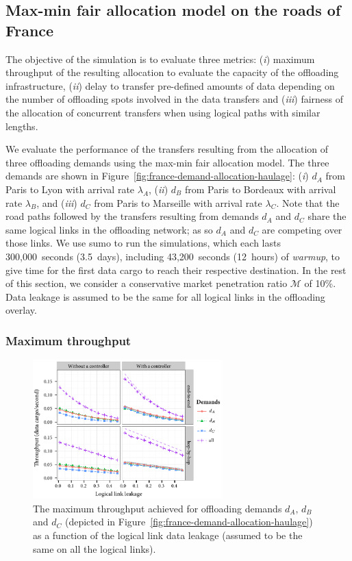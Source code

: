 \subsection{Max-min fair allocation model on the roads of France} 

The objective of the simulation is to evaluate three metrics: (\textit{i}) maximum throughput of the resulting allocation to evaluate the capacity of the offloading infrastructure, (\textit{ii}) delay to transfer pre-defined amounts of data depending on the number of offloading spots involved in the data transfers and (\textit{iii}) fairness of the allocation of concurrent transfers when using logical paths with similar lengths.

We evaluate the performance of the transfers resulting from the allocation of three offloading demands using the max-min fair allocation model. The three demands are shown in Figure~\ref{fig:france-demand-allocation-haulage}: (\textit{i}) $d_A$ from Paris to Lyon with arrival rate $\lambda_A$, (\textit{ii}) $d_B$ from Paris to Bordeaux with arrival rate $\lambda_B$, and (\textit{iii}) $d_C$ from Paris to Marseille with arrival rate $\lambda_C$. Note that the road paths followed by the transfers resulting from demands $d_A$ and $d_C$ share the same logical links in the offloading network; as so $d_A$ and $d_C$ are competing over those links.  We use \acrshort{sumo} to run the simulations, which each lasts 300,000~seconds (3.5~days), including 43,200~seconds (12~hours) of \textit{warmup}, to give time for the first data cargo to reach their respective destination. In the rest of this section, we consider a conservative market penetration ratio $\mathcal{M}$ of 10\%. Data leakage is assumed to be the same for all logical links in the offloading overlay. 

\subsubsection{Maximum throughput}

\begin{figure}[h!]
    \centering
    \includegraphics[width=0.65\textwidth]{results/plot-france-rate-throughput-m-10-wo-MCF.pdf}
    \caption{The maximum throughput achieved for offloading demands $d_A,\,d_B$ and $d_C$ (depicted in Figure~\ref{fig:france-demand-allocation-haulage}) as a function of the logical link data leakage (assumed to be the same on all the logical links).}
    \label{fig:french-net-throughput-leakage}
\end{figure}

